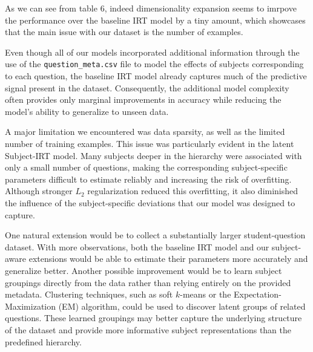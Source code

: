 \documentclass[11pt]{article}
\begin{document}
As we can see from table 6, indeed dimensionality expansion seems to imrpove the performance over the baseline IRT model by a tiny amount, which showcases that the main issue with our dataset is the number of examples. 

Even though all of our models incorporated additional information through the use of the \verb|question_meta.csv| file to model the effects of subjects corresponding to each question, the baseline IRT model already captures much of the predictive signal present in the dataset. Consequently, the additional model complexity often provides only marginal improvements in accuracy while reducing the model's ability to generalize to unseen data.

A major limitation we encountered was data sparsity, as well as the limited number of training examples. This issue was particularly evident in the latent Subject-IRT model. Many subjects deeper in the hierarchy were associated with only a small number of questions, making the corresponding subject-specific parameters difficult to estimate reliably and increasing the risk of overfitting. Although stronger $L_2$ regularization reduced this overfitting, it also diminished the influence of the subject-specific deviations that our model was designed to capture.

One natural extension would be to collect a substantially larger student-question dataset. With more observations, both the baseline IRT model and our subject-aware extensions would be able to estimate their parameters more accurately and generalize better. Another possible improvement would be to learn subject groupings directly from the data rather than relying entirely on the provided metadata. Clustering techniques, such as soft $k$-means or the Expectation-Maximization (EM) algorithm, could be used to discover latent groups of related questions. These learned groupings may better capture the underlying structure of the dataset and provide more informative subject representations than the predefined hierarchy.
\end{document}
